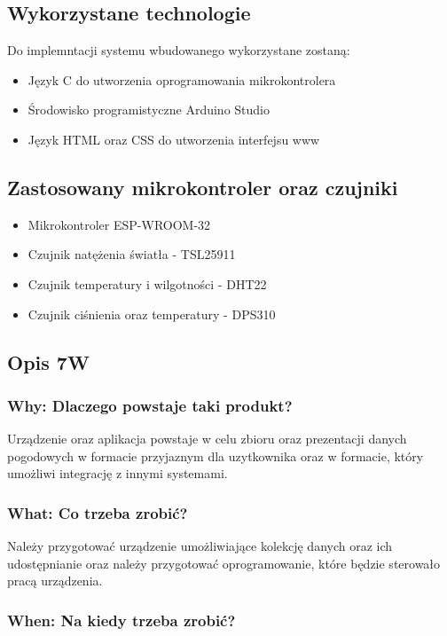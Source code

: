 \documentclass[12pt,a4paper]{article}
\begin{document}
\subsection{Wykorzystane technologie}
Do implemntacji systemu wbudowanego wykorzystane zostaną:
\begin{itemize}
    \item Język C do utworzenia oprogramowania mikrokontrolera
    \item Środowisko programistyczne Arduino Studio
    \item Język HTML oraz CSS do utworzenia interfejsu www
\end{itemize}

\subsection{Zastosowany mikrokontroler oraz czujniki} \label{list_of_components}

\begin{itemize}
    \item Mikrokontroler ESP-WROOM-32
    \item Czujnik natężenia światła - TSL25911
    \item Czujnik temperatury i wilgotności - DHT22
    \item Czujnik ciśnienia oraz temperatury - DPS310
\end{itemize}

\subsection{Opis 7W}

\subsubsection{Why: Dlaczego powstaje taki produkt?}
Urządzenie oraz aplikacja powstaje w celu zbioru oraz prezentacji danych pogodowych w formacie przyjaznym dla uzytkownika oraz w formacie, który
umożliwi integrację z innymi systemami.

\subsubsection{What: Co trzeba zrobić?}
Należy przygotować urządzenie umożliwiające kolekcję danych oraz ich udostępnianie oraz należy przygotować oprogramowanie, które będzie 
sterowało pracą urządzenia.

\subsubsection{When: Na kiedy trzeba zrobić?}
\end{document}
